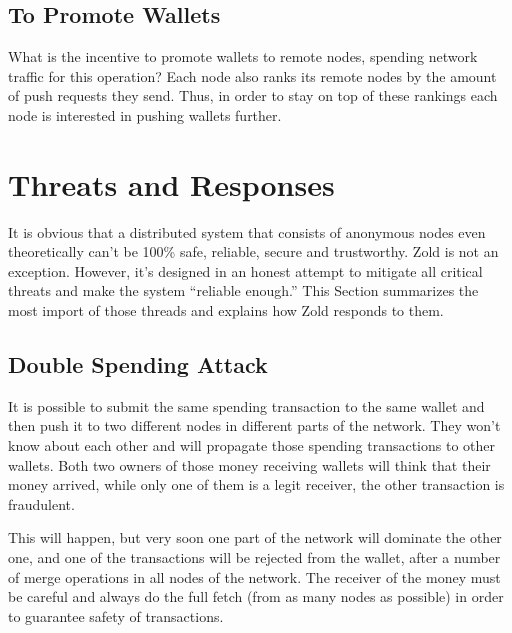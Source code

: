 \documentclass[11pt,oneside]{article}
\begin{document}
\subsection{To Promote Wallets}

What is the incentive to promote wallets to remote nodes, spending network
traffic for this operation? Each node also ranks its remote nodes by the
amount of push requests they send. Thus, in order to stay on top of these rankings
each node is interested in pushing wallets further.


\section{Threats and Responses}\label{sec:threats}

It is obvious that a distributed system that consists of anonymous nodes
even theoretically can't be 100\% safe, reliable, secure and trustworthy.
Zold is not an exception. However, it's designed in an honest attempt
to mitigate all critical threats and make the system ``reliable enough.''
This Section summarizes the most import of those threads and explains
how Zold responds to them.

\subsection{Double Spending Attack}

It is possible to submit the same spending transaction to the same wallet
and then push it to two different nodes in different parts of the network.
They won't know about each other and will propagate those spending
transactions to other wallets. Both two owners of those money receiving
wallets will think that their money arrived, while only one of them is
a legit receiver, the other transaction is fraudulent.

This will happen, but very soon one part of the network will dominate the other
one, and one of the transactions will be rejected from the wallet, after
a number of merge operations in all nodes of the network. The receiver of the
money must be careful and always do the full fetch (from as many nodes
as possible) in order to guarantee safety of transactions.
\end{document}
